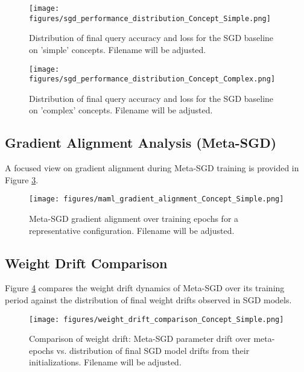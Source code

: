 \documentclass[11pt, a4paper]{article}
\begin{document}
\begin{figure}[H]
    \centering
    \texttt{[image: figures/sgd\_performance\_distribution\_Concept\_Simple.png]}
    \caption{Distribution of final query accuracy and loss for the SGD baseline on 'simple' concepts. Filename will be adjusted.}
    \label{fig:sgd_performance_simple}
\end{figure}

\begin{figure}[H]
    \centering
    \texttt{[image: figures/sgd\_performance\_distribution\_Concept\_Complex.png]}
    \caption{Distribution of final query accuracy and loss for the SGD baseline on 'complex' concepts. Filename will be adjusted.}
    \label{fig:sgd_performance_complex}
\end{figure}

\subsection{Gradient Alignment Analysis (Meta-SGD)}
A focused view on gradient alignment during Meta-SGD training is provided in Figure \ref{fig:metasgd_grad_alignment}.

\begin{figure}[H]
    \centering
    \texttt{[image: figures/maml\_gradient\_alignment\_Concept\_Simple.png]} %
    \caption{Meta-SGD gradient alignment over training epochs for a representative configuration. Filename will be adjusted.}
    \label{fig:metasgd_grad_alignment}
\end{figure}

\subsection{Weight Drift Comparison}
Figure \ref{fig:weight_drift_comparison} compares the weight drift dynamics of Meta-SGD over its training period against the distribution of final weight drifts observed in SGD models.

\begin{figure}[H]
    \centering
    \texttt{[image: figures/weight\_drift\_comparison\_Concept\_Simple.png]} %
    \caption{Comparison of weight drift: Meta-SGD parameter drift over meta-epochs vs. distribution of final SGD model drifts from their initializations. Filename will be adjusted.}
    \label{fig:weight_drift_comparison}
\end{figure}
\end{document}
